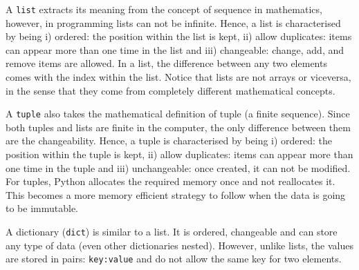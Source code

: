 A \texttt{list} extracts its meaning from the concept of sequence in mathematics,
however, in programming lists can not be infinite.
Hence, a list is characterised by being 
i) ordered: the position within the list is kept, 
ii) allow duplicates: items can appear more than one time in the list and  
iii) changeable: change, add, and remove items are allowed.
In a list, the difference between any two elements comes with the index within the list.
Notice that lists are not arrays or viceversa, in the sense that they come from completely different mathematical concepts. 

A \texttt{tuple} also takes the mathematical definition of tuple (a finite sequence). 
Since both tuples and lists are finite in the computer, the only difference between them are the changeability.
Hence, a tuple is characterised by being 
i) ordered: the position within the tuple is kept, 
ii) allow duplicates: items can appear more than one time in the tuple and  
iii) unchangeable: once created, it can not be modified.
For tuples, Python allocates the required memory once and not reallocates it. 
This becomes a more memory efficient strategy to follow when the data is going to be immutable.



A dictionary (\texttt{dict}) is similar to a list.
It is ordered, changeable and can store any type of data (even other dictionaries nested).
However, unlike lists, the values are stored in pairs: \texttt{key:value} and do not allow the same key for two elements.








